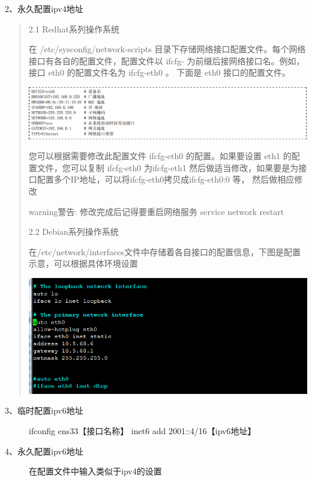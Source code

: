 \documentclass[letterpaper,10pt]{sphinxmanual}
\begin{document}
2、永久配置ipv4地址
\begin{quote}

2.1 Redhat系列操作系统

在 /etc/sysconfig/network-scripts 目录下存储网络接口配置文件。每个网络接口有各自的配置文件，配置文件以 ifcfg- 为前缀后接网络接口名。例如，接口 eth0 的配置文件名为 ifcfg-eth0 。
下面是 eth0 接口的配置文件。

\includegraphics{ifcfg-eth0.png}

您可以根据需要修改此配置文件 ifcfg-eth0 的配置。如果要设置 eth1 的配置文件，您可以复制 ifcfg-eth0 为ifcfg-eth1 然后做适当修改，如果要是为接口配置多个IP地址，可以将ifcfg-eth0拷贝成ifcfg-eth0:0 等，
然后做相应修改

\begin{notice}{warning}{警告:}
修改完成后记得要重启网络服务 service network restart
\end{notice}

2.2 Debian系列操作系统

在/etc/network/interfaces文件中存储着各自接口的配置信息，下图是配置示意，可以根据具体环境设置

\includegraphics{debian-interface.png}
\end{quote}
\begin{description}
\item[{3、临时配置ipv6地址}] \leavevmode
ifconfig ens33【接口名称】 inet6 add 2001::4/16【ipv6地址】

\item[{4、永久配置ipv6地址}] \leavevmode
在配置文件中输入类似于ipv4的设置

\end{description}
\end{document}
